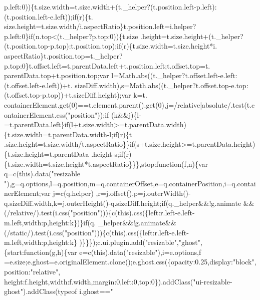 \begin{DoxyCode}
      p.left:0))\{t.size.width=t.size.width+(t.\_helper?(t.position.left-p.left):(t.position.left-e.left));\textcolor{keywordflow}{if}(r)\{t.
      size.height=t.size.width/i.aspectRatio\}t.position.left=i.helper?p.left:0\}\textcolor{keywordflow}{if}(n.top<(t.\_helper?p.top:0))\{t.size
      .height=t.size.height+(t.\_helper?(t.position.top-p.top):t.position.top);\textcolor{keywordflow}{if}(r)\{t.size.width=t.size.height*i.
      aspectRatio\}t.position.top=t.\_helper?p.top:0\}t.offset.left=t.parentData.left+t.position.left;t.offset.top=t.
      parentData.top+t.position.top;var l=Math.abs((t.\_helper?t.offset.left-e.left:(t.offset.left-e.left))+t.
      sizeDiff.width),s=Math.abs((t.\_helper?t.offset.top-e.top:(t.offset.top-p.top))+t.sizeDiff.height);var k=t.
      containerElement.get(0)==t.element.parent().get(0),j=/relative|absolute/.test(t.containerElement.css(\textcolor{stringliteral}{"position"}));\textcolor{keywordflow}{if}
      (k&&j)\{l-=t.parentData.left\}\textcolor{keywordflow}{if}(l+t.size.width>=t.parentData.width)\{t.size.width=t.parentData.width-l;\textcolor{keywordflow}{if}(r)\{t
      .size.height=t.size.width/t.aspectRatio\}\}\textcolor{keywordflow}{if}(s+t.size.height>=t.parentData.height)\{t.size.height=t.parentData
      .height-s;\textcolor{keywordflow}{if}(r)\{t.size.width=t.size.height*t.aspectRatio\}\}\},stop:\textcolor{keyword}{function}(f,n)\{var q=c(\textcolor{keyword}{this}).data(\textcolor{stringliteral}{"resizable
      "}),g=q.options,l=q.position,m=q.containerOffset,e=q.containerPosition,i=q.containerElement;var j=c(q.helper)
      ,r=j.offset(),p=j.outerWidth()-q.sizeDiff.width,k=j.outerHeight()-q.sizeDiff.height;\textcolor{keywordflow}{if}(q.\_helper&&!g.animate
      &&(/relative/).test(i.css(\textcolor{stringliteral}{"position"})))\{c(\textcolor{keyword}{this}).css(\{left:r.left-e.left-m.left,width:p,height:k\})\}\textcolor{keywordflow}{if}(q.
      \_helper&&!g.animate&&(/\textcolor{keyword}{static}/).test(i.css(\textcolor{stringliteral}{"position"})))\{c(\textcolor{keyword}{this}).css(\{left:r.left-e.left-m.left,width:p,height:k\}
      )\}\}\});c.ui.plugin.add(\textcolor{stringliteral}{"resizable"},\textcolor{stringliteral}{"ghost"},\{start:\textcolor{keyword}{function}(g,h)\{var e=c(\textcolor{keyword}{this}).data(\textcolor{stringliteral}{"resizable"}),i=e.options,f
      =e.size;e.ghost=e.originalElement.clone();e.ghost.css(\{opacity:0.25,display:\textcolor{stringliteral}{"block"},position:\textcolor{stringliteral}{"relative"},
      height:f.height,width:f.width,margin:0,left:0,top:0\}).addClass(\textcolor{stringliteral}{"ui-resizable-ghost"}).addClass(typeof i.ghost==\textcolor{stringliteral}{"
}
\end{DoxyCode}
